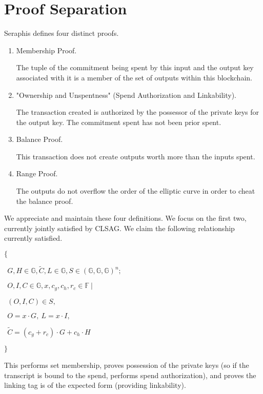 \documentclass[]{article}
\begin{document}
\newpage

\section{Proof Separation}

Seraphis defines four distinct proofs.

\begin{enumerate}
	\item
	Membership Proof.
	
	The tuple of the commitment being spent by this input and the output key associated with it is a member of the set of outputs within this blockchain.

	\item "Ownership and Unspentness" (Spend Authorization and Linkability).
	
	The transaction created is authorized by the possessor of the private keys for the output key. The commitment spent has not been prior spent.
	
	\item
	Balance Proof.
	
	This transaction does not create outputs worth more than the inputs spent.
	
	\item
	Range Proof.
	
	The outputs do not overflow the order of the elliptic curve in order to cheat the balance proof.
\end{enumerate}

We appreciate and maintain these four definitions. We focus on the first two, currently jointly satisfied by CLSAG. We claim the following relationship currently satisfied.

$\{$

$~~G, H \in \mathbb{G}, \tilde{C}, L \in \mathbb{G}, S \in (\mathbb{G}, \mathbb{G}, \mathbb{G})^n;$

$~~O, I, C \in \mathbb{G}, x, c_g, c_h, r_c \in \mathbb{F} ~|$

$~~(O, I, C) \in S,~$

$~~O = x \cdot G,~ L = x \cdot I,$

$~~\tilde{C} = (c_g + r_c) \cdot G + c_h \cdot H$

$\}$

This performs set membership, proves possession of the private keys (so if the transcript is bound to the spend, performs spend authorization), and proves the linking tag is of the expected form (providing linkability).
\end{document}
